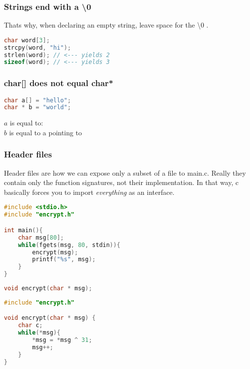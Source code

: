 \subsubsection{Strings end with a \textbackslash 0}

Thats why, when declaring an empty string, leave space for the \textbackslash 0 .

\begin{lstlisting}[language=c]
char word[3];
strcpy(word, "hi");
strlen(word); // <--- yields 2
sizeof(word); // <--- yields 3
\end{lstlisting}


\subsubsection{char[] does not equal char*}

\begin{lstlisting}[language=c]
char a[] = "hello";
char * b = "world";
\end{lstlisting}

$a$ is equal to:       \\
$b$ is equal to a  pointing to      




\subsubsection{Header files}

Header files are how we can expose only a subset of a file to main.c. Really they contain only the function signatures, not their implementation. In that way, c basically forces you to import \emph{everything} as an interface. 


\begin{lstlisting}[language=c,caption={main.c}]
#include <stdio.h>
#include "encrypt.h"

int main(){
    char msg[80];
    while(fgets(msg, 80, stdin)){
        encrypt(msg);
        printf("%s", msg);
    }
}
\end{lstlisting}


\begin{lstlisting}[language=c,caption={encrypt.h}]
void encrypt(char * msg);
\end{lstlisting}


\begin{lstlisting}[language=c,caption={encrypt.c}]
#include "encrypt.h"

void encrypt(char * msg) {
    char c;
    while(*msg){
        *msg = *msg ^ 31;
        msg++;
    }
}
\end{lstlisting}





